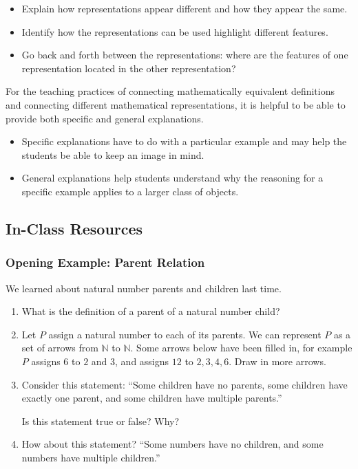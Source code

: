 \documentclass[11pt]{article}
\newcommand{\handout}{\subsubsection}
\newcommand\header[1]{\vspace*{4pt}\par {\large {\bf #1}}\par}
\newcommand{\N}{\mathbb{N}}
\theoremstyle{definition}
\begin{document}
\begin{itemize}
\item Explain how representations appear different and how they appear the same.
\item Identify how the representations can be used highlight different features. 
\item Go back and forth between the representations: where are the features of one representation located in the other representation?
\end{itemize}

For the teaching practices of connecting mathematically equivalent definitions and connecting different mathematical representations, it is helpful to be able to provide both specific and general explanations. 	\begin{itemize}
	\item Specific explanations have to do with a particular example and may help the students be able to keep an image in mind. 
	\item General explanations help students understand why the reasoning for a specific example applies to a larger class of objects.
	\end{itemize}


\newpage \subsection{In-Class Resources}  

\handout{Opening Example: Parent Relation}


We learned about natural number parents and children last time.

\begin{enumerate}
\item What is the definition of a parent of a natural number child? 
\item 
Let $P$ assign a natural number to each of its parents. We can represent $P$ as a set of arrows from $\N$ to $\N$.  Some arrows below have been filled in, for example $P$ assigns $6$ to $2$ and $3$, and assigns $12$ to $2, 3, 4, 6$.  Draw in more arrows.

\item Consider this statement: ``Some children have no parents, some children have exactly one parent, and some children have multiple parents.''  

Is this statement true or false? Why?

\item How about this statement? ``Some numbers have no children, and some numbers have multiple children.'' 
\end{enumerate}
\end{document}
